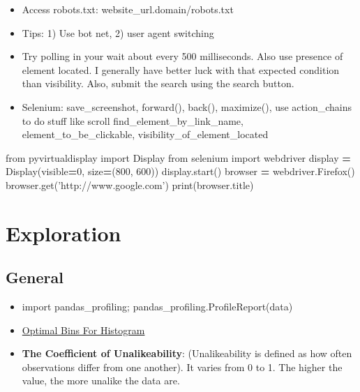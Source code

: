 \documentclass[]{book}
\newenvironment{Shaded}{\begin{snugshade}}{\end{snugshade}}
\newcommand{\DecValTok}[1]{\textcolor[rgb]{0.00,0.00,0.81}{#1}}
\newcommand{\StringTok}[1]{\textcolor[rgb]{0.31,0.60,0.02}{#1}}
\newcommand{\ImportTok}[1]{#1}
\newcommand{\OperatorTok}[1]{\textcolor[rgb]{0.81,0.36,0.00}{\textbf{#1}}}
\newcommand{\BuiltInTok}[1]{#1}
\newcommand{\NormalTok}[1]{#1}
\theoremstyle{definition}
\theoremstyle{definition}
\theoremstyle{definition}
\theoremstyle{remark}
\begin{document}
\begin{itemize}
\item
  Access robots.txt: website\_url.domain/robots.txt
\item
  Tips: 1) Use bot net, 2) user agent switching
\item
  Try polling in your wait about every 500 milliseconds. Also use
  presence of element located. I generally have better luck with that
  expected condition than visibility. Also, submit the search using the
  search button.
\item
  Selenium: save\_screenshot, forward(), back(), maximize(), use
  action\_chains to do stuff like scroll find\_element\_by\_link\_name,
  element\_to\_be\_clickable, visibility\_of\_element\_located
\end{itemize}

\begin{Shaded}
\begin{Highlighting}[]
\ImportTok{from}\NormalTok{ pyvirtualdisplay }\ImportTok{import}\NormalTok{ Display  }
\ImportTok{from}\NormalTok{ selenium }\ImportTok{import}\NormalTok{ webdriver  }
\NormalTok{display }\OperatorTok{=}\NormalTok{ Display(visible}\OperatorTok{=}\DecValTok{0}\NormalTok{, size}\OperatorTok{=}\NormalTok{(}\DecValTok{800}\NormalTok{, }\DecValTok{600}\NormalTok{))  }
\NormalTok{display.start()  }
\NormalTok{browser }\OperatorTok{=}\NormalTok{ webdriver.Firefox()  }
\NormalTok{browser.get(}\StringTok{'http://www.google.com'}\NormalTok{)  }
\BuiltInTok{print}\NormalTok{(browser.title)}
\end{Highlighting}
\end{Shaded}

\section{Exploration}\label{exploration}

\subsection{General}\label{general-1}

\begin{itemize}
\item
  import pandas\_profiling; pandas\_profiling.ProfileReport(data)
\item
  \href{https://stats.stackexchange.com/questions/798/calculating-optimal-number-of-bins-in-a-histogram/862\#862}{Optimal
  Bins For Histogram}
\item
  \textbf{The Coefficient of Unalikeability}: (Unalikeability is defined
  as how often observations differ from one another). It varies from 0
  to 1. The higher the value, the more unalike the data are.
\end{itemize}
\end{document}
